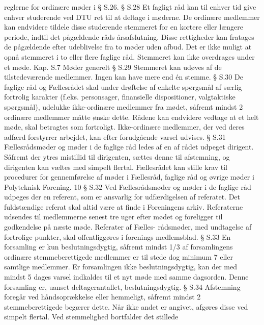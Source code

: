             reglerne for ordinære møder i § S.26.
§ S.28 Et fagligt råd kan til enhver tid give enhver studerende ved DTU ret til at deltage i møderne. De ordinære
          medlemmer kan endvidere tildele disse studerende stemmeret for en kortere eller længere periode, indtil det
          pågældende råds årsafslutning. Disse rettigheder kan fratages de pågældende efter udeblivelse fra to møder
                uden afbud. Det er ikke muligt at opnå stemmeret i to eller flere faglige råd. Stemmeret kan ikke overdrages
                 under et møde.
Kap. S.7 Møder generelt
§ S.29 Stemmeret kan udøves af de tilstedeværende medlemmer. Ingen kan have mere end én stemme.
§ S.30 De faglige råd og Fællesrådet skal under drøftelse af enkelte spørgsmål af særlig fortrolig karakter (f.eks.
              personsager, finansielle dispositioner, valgtaktiske spørgsmål), udelukke ikke-ordinære medlemmer fra
                mødet, såfremt mindst 2 ordinære medlemmer måtte ønske dette. Rådene kan endvidere vedtage at et helt
                     møde, skal betragtes som fortroligt.
                     Ikke-ordinære medlemmer, der ved deres adfærd forstyrrer arbejdet, kan efter forudgående varsel udvises.
§ S.31 Fællesrådsmøder og møder i de faglige råd ledes af en af rådet udpeget dirigent. Såfremt der ytres mistillid til
              dirigenten, sættes denne til afstemning, og dirigenten kan væltes med simpelt flertal. Fællesrådet kan stille
                 krav til procedurer for gennemførelse af møder i Fællesråd, faglige råd og øvrige møder i Polyteknisk
                       Forening.
10
§ S.32 Ved Fællesrådsmøder og møder i de faglige råd udpeges der en referent, som er ansvarlig for udfærdigelsen
             af referatet. Det fuldstændige referat skal altid være at finde i Foreningens arkiv. Referaterne udsendes til
              medlemmerne senest tre uger efter mødet og foreligger til godkendelse på næste møde. Referater af Fælles-
                  rådsmøder, med undtagelse af fortrolige punkter, skal offentliggøres i forenings medlemsblad.
§ S.33 En forsamling er kun beslutningsdygtig, såfremt mindst 1/3 af forsamlingens ordinære stemmeberettigede
         medlemmer er til stede dog minimum 7 eller samtlige medlemmer. Er forsamlingen ikke beslutningsdygtig,
        kan der med mindst 5 dages varsel indkaldes til et nyt møde med samme dagsorden. Denne forsamling er,
        uanset deltagerantallet, beslutningsdygtig.
§ S.34 Afstemning foregår ved håndsoprækkelse eller hemmeligt, såfremt mindst 2 stemmeberettigede begærer
            dette. Når ikke andet er angivet, afgøres disse ved simpelt flertal. Ved stemmelighed bortfalder det stillede
